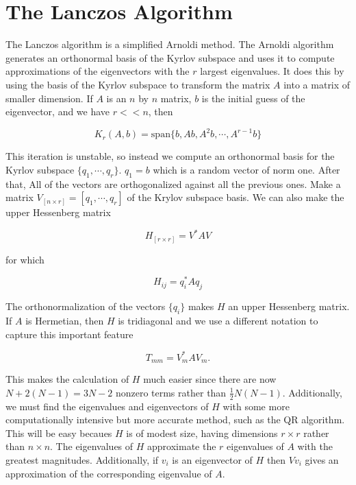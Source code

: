 \documentclass[12pt, a4paper, twocolumn]{article}
\begin{document}
\section{The Lanczos Algorithm}
\label{sec:nummeth}

The Lanczos algorithm is a simplified Arnoldi method. The Arnoldi algorithm generates an orthonormal basis of the Kyrlov subspace and uses it to compute approximations of the eigenvectors with the $r$ largest eigenvalues. It does this by using the basis of the Kyrlov subspace to transform the matrix $A$ into a matrix of smaller dimension. If $A$ is an $n$ by $n$ matrix, $b$ is the initial guess of the eigenvector, and we have $r<<n$, then

\begin{equation}
K_r(A,b) = \mathrm{span} \{b,Ab,A^2 b,\cdots ,A^{r-1}b\}
\end{equation}

This iteration is unstable, so instead we compute an orthonormal basis for the Kyrlov subspace $\{q_1,\cdots , q_r \}$. $q_1=b$ which is a random vector of norm one. After that, All of the vectors are orthogonalized against all the previous ones. Make a matrix $V_{[n\times r]}=[q_1,\cdots,q_r]$ of the Krylov subspace basis. We can also make the upper Hessenberg matrix

\begin{equation}
H_{[r\times r]}=V^*AV
\end{equation}

for which 

\begin{equation}
H_{ij} = q_i^*Aq_j
\end{equation}

The orthonormalization of the vectors $\{q_i\}$ makes $H$ an upper Hessenberg matrix. If $A$ is Hermetian, then $H$ is tridiagonal and we use a different notation to capture this important feature

\begin{equation}
T_{mm}=V_m^* A V_m.
\end{equation}

This makes the calculation of $H$ much easier since there are now $N+2(N-1)=3N-2$ nonzero terms rather than $\frac{1}{2}N(N-1)$. Additionally, we must find the eigenvalues and eigenvectors of $H$ with some more computationally intensive but more accurate method, such as the QR algorithm. This will be easy becaues $H$ is of modest size, having dimensions $r \times r$ rather than $n \times n$. The eigenvalues of $H$ approximate the $r$ eigenvalues of $A$ with the greatest magnitudes. Additionally, if $v_i$ is an eigenvector of $H$ then $Vv_i$ gives an approximation of the corresponding eigenvalue of $A$.
\end{document}
